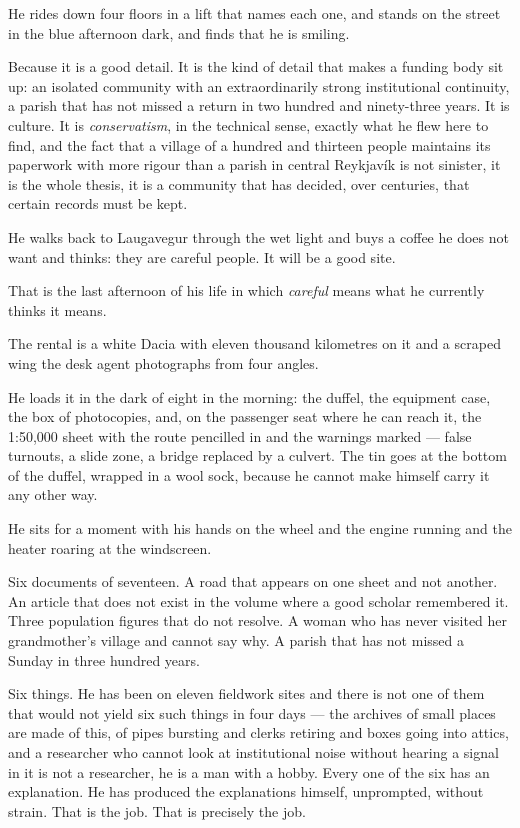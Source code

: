 \documentclass[11pt,oneside]{book}
\newcommand{\sceneline}{%
  \par\vspace{1.2em}
  \begin{center}
    \fontsize{11}{11}\selectfont \textbullet\quad\textbullet\quad\textbullet
  \end{center}
  \vspace{0.6em}\noindent\ignorespaces
}
\begin{document}
He rides down four floors in a lift that names each one, and stands on
the street in the blue afternoon dark, and finds that he is smiling.

Because it is a good detail. It is the kind of detail that makes a
funding body sit up: an isolated community with an extraordinarily
strong institutional continuity, a parish that has not missed a return in
two hundred and ninety-three years. It is culture. It is
\emph{conservatism}, in the technical sense, exactly what he flew here to
find, and the fact that a village of a hundred and thirteen people
maintains its paperwork with more rigour than a parish in central
Reykjavík is not sinister, it is the whole thesis, it is a community
that has decided, over centuries, that certain records must be kept.

He walks back to Laugavegur through the wet light and buys a coffee he
does not want and thinks: they are careful people. It will be a good
site.

That is the last afternoon of his life in which \emph{careful} means
what he currently thinks it means.

\sceneline

The rental is a white Dacia with eleven thousand kilometres on it and a
scraped wing the desk agent photographs from four angles.

He loads it in the dark of eight in the morning: the duffel, the
equipment case, the box of photocopies, and, on the passenger seat where
he can reach it, the 1:50,000 sheet with the route pencilled in and the
warnings marked --- false turnouts, a slide zone, a bridge replaced by a
culvert. The tin goes at the bottom of the duffel, wrapped in a wool
sock, because he cannot make himself carry it any other way.

He sits for a moment with his hands on the wheel and the engine running
and the heater roaring at the windscreen.

Six documents of seventeen. A road that appears on one sheet and not
another. An article that does not exist in the volume where a good
scholar remembered it. Three population figures that do not resolve. A
woman who has never visited her grandmother's village and cannot say
why. A parish that has not missed a Sunday in three hundred years.

Six things. He has been on eleven fieldwork sites and there is not one
of them that would not yield six such things in four days --- the
archives of small places are made of this, of pipes bursting and clerks
retiring and boxes going into attics, and a researcher who cannot look
at institutional noise without hearing a signal in it is not a
researcher, he is a man with a hobby. Every one of the six has an
explanation. He has produced the explanations himself, unprompted,
without strain. That is the job. That is precisely the job.
\end{document}
